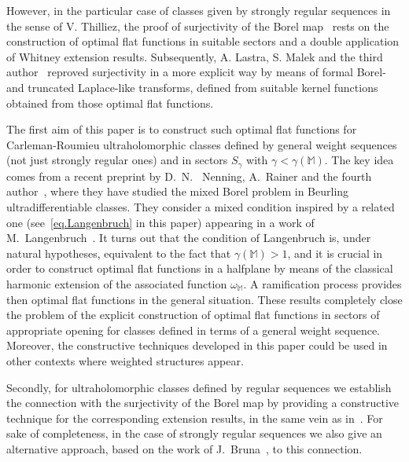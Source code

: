 \documentclass[11pt,a4paper]{article}
\theoremstyle{plain}
\theoremstyle{definition}
\newcommand{\M}{\mathbb{M}}
\begin{document}
However, in the particular case of classes given by strongly regular sequences in the sense of V. Thilliez, the proof of surjectivity of the Borel map~\cite{Thilliez03} rests on the construction of optimal flat functions in suitable sectors and a double application of Whitney extension results. Subsequently, A. Lastra, S. Malek and the third author~\cite{LastraMalekSanzContinuousRightLaplace} reproved surjectivity in a more explicit way by means of formal Borel- and truncated Laplace-like transforms, defined from suitable kernel functions obtained from those optimal flat functions.

The first aim of this paper is to construct such optimal flat functions for Carleman-Roumieu ultraholomorphic classes defined by general weight sequences (not just strongly regular ones) and in sectors $S_\gamma$ with $\gamma<\gamma(\M)$. The key idea comes from a recent preprint by D.~N.~ Nenning, A.~Rainer and the fourth author~\cite{NenningRainerSchindl_preprint}, where they have studied the mixed Borel problem in Beurling ultradifferentiable classes. They consider a mixed condition inspired by a related one (see~\eqref{eq.Langenbruch} in this paper) appearing in a work of M.~Langenbruch~\cite{Langenbruch94}. It turns out that the condition of Langenbruch is, under natural hypotheses, equivalent to the fact that  $\gamma(\M)>1$, and it is crucial in order to construct optimal flat functions in a halfplane by means of the classical harmonic extension of the associated function $\omega_{\M}$. A ramification process provides then optimal flat functions in the general situation.
These results completely close the problem of the explicit construction of optimal flat functions in sectors of appropriate opening for classes defined in terms of a general weight sequence. Moreover, the constructive techniques developed in this paper could be used in other contexts where weighted structures appear.



Secondly, for ultraholomorphic classes defined by regular sequences we establish the connection with the surjectivity of the Borel map by providing a constructive technique for the corresponding extension results, in the same vein as in~\cite{LastraMalekSanzContinuousRightLaplace}. For sake of completeness, in the case of strongly regular sequences we also give an alternative approach, based on the work of J.~Bruna~\cite{Brunaext80}, to this connection.
\end{document}
